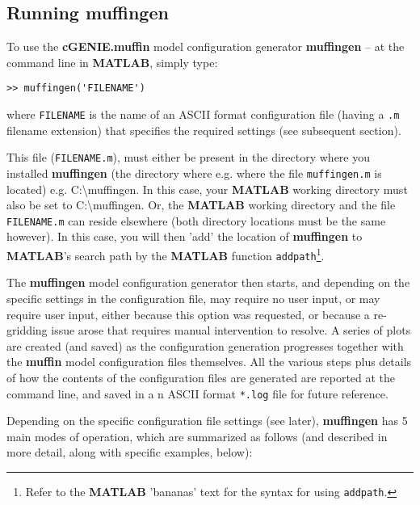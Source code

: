 \documentclass[11pt,fleqn]{book} %
\begin{document}
\newpage

\subsection{Running muffingen}

To use the \textbf{cGENIE.muffin} model configuration generator \textbf{muffingen} -- at the command line in \textbf{MATLAB}, simply type:

\vspace{-2mm}
\begin{verbatim}
>> muffingen('FILENAME')
\end{verbatim}
\vspace{-2mm}

\noindent where \texttt{FILENAME} is the name of an ASCII format configuration file (having a \texttt{.m} filename extension) that specifies the required settings (see subsequent section).

This file (\texttt{FILENAME.m}), must either be present in the directory where you installed \textbf{muffingen} (the directory where e.g. where the file \texttt{muffingen.m} is located) e.g. \textsf{C:\textbackslash muffingen}. In this case, your \textbf{MATLAB} working directory must also be  set to \textsf{C:\textbackslash muffingen}. Or, the \textbf{MATLAB} working directory and the file \texttt{FILENAME.m} can reside elsewhere (both directory locations must be the same however). In this case, you will then 'add' the location of \textbf{muffingen} to \textbf{MATLAB}'s search path by the \textbf{MATLAB} function \texttt{addpath}\footnote{Refer to the \textbf{MATLAB} '\textsf{bananas}' text for the syntax for using \texttt{addpath}.}.

The \textbf{muffingen} model configuration generator then starts, and depending on the specific settings in the configuration file, may require no user input, or may require user input, either because this option was requested, or because a re-gridding issue arose that requires manual intervention to resolve. A series of plots are created (and saved) as the configuration generation progresses together with the \textbf{muffin} model configuration files themselves. All the various steps plus details of how the contents of the configuration files are generated are reported at the command line, and saved in a n ASCII format \texttt{*.log} file for future reference.

Depending on the specific configuration file settings (see later), \textbf{muffingen} has 5 main modes of operation, which are summarized as follows (and described in more detail, along with specific examples, below):
\end{document}
